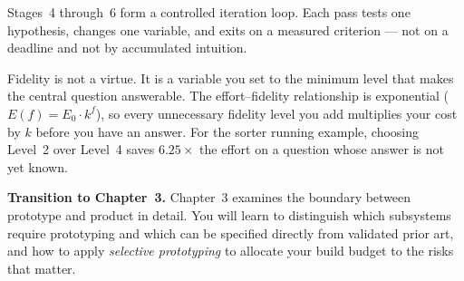 Stages~4 through~6 form a controlled iteration loop.
Each pass tests one hypothesis, changes one variable, and exits on a
measured criterion --- not on a deadline and not by accumulated intuition.

Fidelity is not a virtue.
It is a variable you set to the minimum level that makes the central
question answerable.
The effort--fidelity relationship is exponential ($E(f) = E_0 \cdot k^f$),
so every unnecessary fidelity level you add multiplies your cost by $k$
before you have an answer.
For the sorter running example, choosing Level~2 over Level~4 saves
$6.25\times$ the effort on a question whose answer is not yet known.

\bigskip
\noindent\textbf{Transition to Chapter~3.}
Chapter~3 examines the boundary between prototype and product in detail.
You will learn to distinguish which subsystems require prototyping and which
can be specified directly from validated prior art, and how to apply
\emph{selective prototyping} to allocate your build budget to the risks that
matter.
